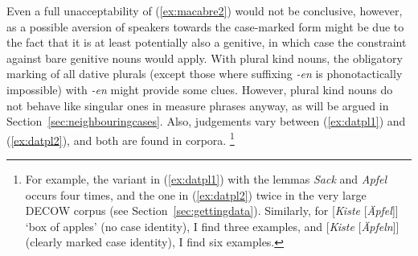 \begin{exe}
  \ex\label{ex:macabre}
  \begin{xlist}
  \end{xlist}
\end{exe}

Even a full unacceptability of (\ref{ex:macabre2}) would not be conclusive, however, as a possible aversion of speakers towards the case-marked form might be due to the fact that it is at least potentially also a genitive, in which case the constraint against bare genitive nouns would apply.
With plural kind nouns, the obligatory marking of all dative plurals (except those where suffixing \textit{-en} is phonotactically impossible) with \textit{-en} might provide some clues.
However, plural kind nouns do not behave like singular ones in measure phrases anyway, as will be argued in Section~\ref{sec:neighbouringcases}.
Also, judgements vary between (\ref{ex:datpl1}) and (\ref{ex:datpl2}), and both are found in corpora.%
\footnote{For example, the variant in (\ref{ex:datpl1}) with the lemmas \textit{Sack} and \textit{Apfel} occurs four times, and the one in (\ref{ex:datpl2}) twice in the very large DECOW corpus (see Section~\ref{sec:gettingdata}).
Similarly, for [\textit{Kiste} [\textit{Äpfel}]] `box of apples' (no case identity), I find three examples, and [\textit{Kiste} [\textit{Äpfeln}]] (clearly marked case identity), I find six examples.
}

\begin{exe}
  \ex\label{ex:datpl} 
  \begin{xlist}
  \end{xlist}
\end{exe}

